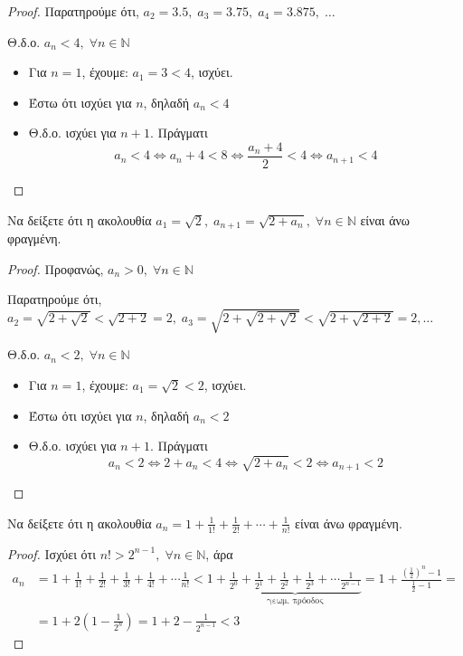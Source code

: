 \documentclass[a4paper,table]{report}
\begin{document}
\begin{enumerate}
\begin{proof}
      Παρατηρούμε ότι, $ a_{2}=3.5, \; a_{3}=3.75, \; a_{4}=3.875, \; 
      \ldots $

      Θ.δ.ο. $ a_{n} < 4, \; \forall n \in \mathbb{N} $ 
      \begin{itemize}
        \item Για $ n=1 $, έχουμε: $ a_{1}=3 < 4 $, ισχύει.
        \item Έστω ότι ισχύει για $n$, δηλαδή $ a_{n} < 4 $
        \item Θ.δ.ο. ισχύει για $ n+1 $. Πράγματι
          \[
            a_{n}<4 \Leftrightarrow a_{n}+4 < 8 \Leftrightarrow 
            \frac{a_{n}+4}{2} < 4 \Leftrightarrow a_{n+1} <4
          \] 
      \end{itemize}
    \end{proof}

  \item Να δείξετε ότι η ακολουθία $ a_{1} = \sqrt{2}, \; a_{n+1} =
    \sqrt{2+ a_{n}}, \; \forall n \in \mathbb{N} $ είναι άνω φραγμένη.
    \begin{proof}
    \item {}
      Προφανώς, $ a_{n} > 0, \; \forall n \in \mathbb{N} $ 

      Παρατηρούμε ότι, $ a_{2}= \sqrt{2 + \sqrt{2}} < \sqrt{2+2} =2, \; 
      a_{3}= \sqrt{2+ \sqrt{2 + \sqrt{2}}} < \sqrt{2+ \sqrt{2+2}} = 2, 
      \ldots $ 

      Θ.δ.ο. $ a_{n} < 2, \; \forall n \in \mathbb{N} $ 
      \begin{itemize}
        \item Για $ n=1 $, έχουμε: $ a_{1}= \sqrt{2} < 2 $, ισχύει.
        \item Έστω ότι ισχύει για $n$, δηλαδή $ a_{n} < 2 $
        \item Θ.δ.ο. ισχύει για $ n+1 $. Πράγματι
          \[
            a_{n}<2 \Leftrightarrow 2+a_{n} < 4 \Leftrightarrow 
            \sqrt{2+ a_{n}} < 2\Leftrightarrow a_{n+1} <2
          \] 
      \end{itemize}
    \end{proof}


  \item Να δείξετε ότι η ακολουθία $ a_{n} = 1 + \frac{1}{1!} +
    \frac{1}{2!} + \cdots + \frac{1}{n!} $ είναι άνω φραγμένη.
    \begin{proof}
    \item {} 
      Ισχύει ότι $ n! > 2^{n-1}, \; \forall n \in \mathbb{N} $, άρα 
      \begin{align*}
        a_{n} &= 1 + \frac{1}{1!} + \frac{1}{2!} + \frac{1}{3!} + 
        \frac{1}{4!} + \cdots \frac{1}{n!} < 1 + 
        \underbrace{\frac{1}{2^{0}} 
          + \frac{1}{2^{1}} + \frac{1}{2^{2}} + \frac{1}{2^{3}} 
        + \cdots \frac{1}{2^{n-1}}}_ {\text{γεωμ. πρόοδος}} = 
        1 + \frac{\left(\frac{1}{2}\right)^{n}-1}{\frac{1}{2} -1} =\\ 
              &= 1 + 2\left(1- \frac{1}{2^{n}}\right) = 1+2- 
              \frac{1}{2^{n-1}} < 3 
      \end{align*} 
    \end{proof}


\end{enumerate}
\end{document}
